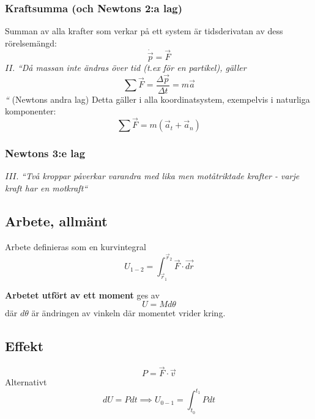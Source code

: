 \documentclass{article}
\newenvironment{ankiflashcard}[1]{}{}
\begin{document}
\begin{paracol}{2}
\begin{ankiflashcard}{Forumlera Newtons andra lag}
\subsubsection{Kraftsumma (och Newtons 2:a lag)}
Summan av alla krafter som verkar på ett system är tidsderivatan av dess rörelsemängd:
$$\dot{\vec p} = \vec F$$
$II.$ \textit{``Då massan inte ändras över tid (t.ex för en partikel), gäller
$$\sum \vec F= \frac{\Delta \vec p}{\Delta t} = m\vec a$$``}
(Newtons andra lag)
Detta gäller i alla koordinatsystem, exempelvis i naturliga komponenter:
$$\sum \vec F = m(\vec a_t + \vec a_n)$$
\end{ankiflashcard}

\begin{ankiflashcard}{Formulera Newtons tredje lag}
\subsubsection{Newtons 3:e lag}
$III.$ \textit{``Två kroppar påverkar varandra med lika men motåtriktade krafter - varje kraft har en motkraft``}
\end{ankiflashcard}

\subsection{Arbete, allmänt}

\begin{ankiflashcard}{Definiera arbete (generella definitionen)}
Arbete definieras som en kurvintegral
$$
U_{1-2} = \int_{\vec r_1}^{\vec r_2} \vec F \cdot \vec{dr}
$$
\end{ankiflashcard}

\begin{ankiflashcard}{Definiera arbete utfört av ett moment}
\textbf{Arbetet utfört av ett moment} ges av $$U=Md\theta$$ där $d\theta$ är ändringen av vinkeln där momentet vrider kring.
\end{ankiflashcard}

\begin{ankiflashcard}{Definiera effekt.}
\subsection{Effekt}
$$P = \vec F \cdot \vec v$$
Alternativt
$$dU = Pdt \implies U_{0-1}=\int_{t_0}^{t_1} P dt$$
\end{ankiflashcard}


\end{paracol}
\end{document}
